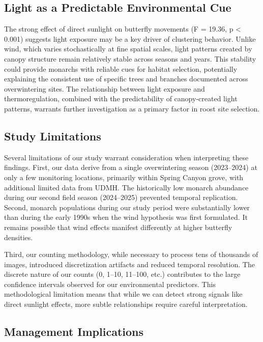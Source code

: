 \subsection{Light as a Predictable Environmental Cue}

The strong effect of direct sunlight on butterfly movements (F = 19.36, p < 0.001) suggests light exposure may be a key driver of clustering behavior. Unlike wind, which varies stochastically at fine spatial scales, light patterns created by canopy structure remain relatively stable across seasons and years. This stability could provide monarchs with reliable cues for habitat selection, potentially explaining the consistent use of specific trees and branches documented across overwintering sites. The relationship between light exposure and thermoregulation, combined with the predictability of canopy-created light patterns, warrants further investigation as a primary factor in roost site selection. %

\subsection{Study Limitations}

Several limitations of our study warrant consideration when interpreting these findings. First, our data derive from a single overwintering season (2023--2024) at only a few monitoring locations, primarily within Spring Canyon grove, with additional limited data from UDMH. The historically low monarch abundance during our second field season (2024--2025) prevented temporal replication. Second, monarch populations during our study period were substantially lower than during the early 1990s when the wind hypothesis was first formulated. It remains possible that wind effects manifest differently at higher butterfly densities.

Third, our counting methodology, while necessary to process tens of thousands of images, introduced discretization artifacts and reduced temporal resolution. The discrete nature of our counts (0, 1--10, 11--100, etc.) contributes to the large confidence intervals observed for our environmental predictors. This methodological limitation means that while we can detect strong signals like direct sunlight effects, more subtle relationships require careful interpretation.

\subsection{Management Implications}

